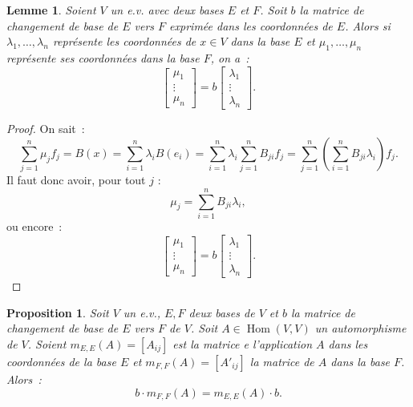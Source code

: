 \documentclass{article}
\DeclareMathOperator{\Hom}{Hom}
\newtheorem{prp}[thm]{Proposition}
\newtheorem{lem}[thm]{Lemme}
\theoremstyle{definition}
\theoremstyle{remark}
\begin{document}
		\begin{lem} Soient $V$ un e.v. avec deux bases $E$ et $F$. Soit $b$ la matrice de changement de base de $E$ vers $F$ exprimée dans les coordonnées de $E$.
		Alors si $\lambda_1, \dotsc, \lambda_n$ représente les coordonnées de $x \in V$ dans la base $E$ et $\mu_1, \dotsc, \mu_n$ représente ses coordonnées dans la
		base $F$, on a~: \[\begin{bmatrix}\mu_1 \\\vdots \\ \mu_n\end{bmatrix} = b\begin{bmatrix}\lambda_1 \\ \vdots \\ \lambda_n\end{bmatrix}.\]\end{lem}

		\begin{proof} On sait~: \[\sum_{j=1}^n\mu_jf_j = B(x) = \sum_{i=1}^n\lambda_iB(e_i) = \sum_{i=1}^n\lambda_i\sum_{j=1}^nB_{ji}f_j
		= \sum_{j=1}^n\left(\sum_{i=1}^nB_{ji}\lambda_i\right)f_j.\] Il faut donc avoir, pour tout $j$ : \[\mu_j = \sum_{i=1}^nB_{ji}\lambda_i,\] ou encore~:
		\[\begin{bmatrix}\mu_1 \\ \vdots \\ \mu_n\end{bmatrix} = b\begin{bmatrix}\lambda_1 \\ \vdots \\ \lambda_n\end{bmatrix}.\] \end{proof}

		\begin{prp} Soit $V$ un e.v., $E, F$ deux bases de $V$ et $b$ la matrice de changement de base de $E$ vers $F$ de $V$. Soit $A \in \Hom(V, V)$ un automorphisme
		de $V$. Soient $m_{E, E}(A) = [A_{ij}]$ est la matrice e l'application $A$ dans les coordonnées de la base $E$ et $m_{F, F}(A) = [A'_{ij}]$ la matrice de $A$
		dans la base $F$. Alors~: \[b \cdot m_{F, F}(A) = m_{E, E}(A) \cdot b.\] \end{prp}
\end{document}
